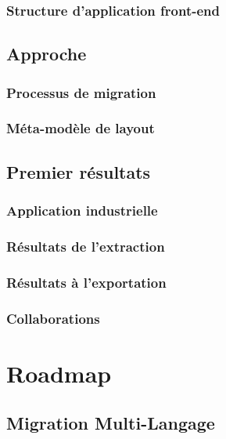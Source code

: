 \documentclass[a4paper]{article}
\begin{document}
\subsubsection{Structure d'application front-end}
\label{sec:guiDecomposition}


\subsection{Approche}
\label{sec:approche}

\subsubsection{Processus de migration}
\label{sec:processusMigration}
\subsubsection{Méta-modèle de layout}
\label{sec:layout}
\subsection{Premier résultats}
\label{sec:resultats}

\subsubsection{Application industrielle}
\label{sec:industrial}


\subsubsection{Résultats de l'extraction}
\label{sec:retroImport}

\subsubsection{Résultats à l'exportation}
\label{sec:export}


\subsubsection{Collaborations}
\label{sec:impact}

\section{Roadmap}
\label{sec:roadmap}

\subsection{Migration Multi-Langage}
\label{sec:migrationMultiLangage}
\end{document}
